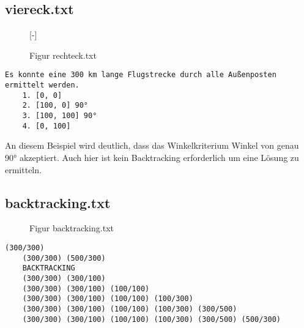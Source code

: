 \documentclass[a4paper,10pt,ngerman]{scrartcl}
\begin{document}
    \subsection{viereck.txt}\label{subsec:viereck.txt}

    \begin{figure}[H]
        [-]
        \FigurFuenf{}
        \caption{Figur rechteck.txt}
        \label{fig:Figure3}
    \end{figure}

    \begin{lstlisting}[frame=single, title=Programmausgabe rechteck.txt, breaklines=true,label={lst:lstlisting3}]
    Es konnte eine 300 km lange Flugstrecke durch alle Außenposten ermittelt werden.
    1. [0, 0]
    2. [100, 0] 90°
    3. [100, 100] 90°
    4. [0, 100]
    \end{lstlisting}

    An diesem Beispiel wird deutlich, dass das Winkelkriterium Winkel von genau 90° akzeptiert.
    Auch hier ist kein Backtracking erforderlich um eine Lösung zu ermitteln.

    \subsection{backtracking.txt}\label{subsec:backtracking.txt}

    \begin{figure}[H]
        \caption{Figur backtracking.txt}
        \label{fig:Figure8}
    \end{figure}

    \begin{lstlisting}[frame=single, title=Programmablaufausgabe backtracking.txt, breaklines=true,label={lst:lstlisting12}]
    (300/300)
    (300/300) (500/300)
    BACKTRACKING
    (300/300) (300/100)
    (300/300) (300/100) (100/100)
    (300/300) (300/100) (100/100) (100/300)
    (300/300) (300/100) (100/100) (100/300) (300/500)
    (300/300) (300/100) (100/100) (100/300) (300/500) (500/300)
    \end{lstlisting}
\end{document}
